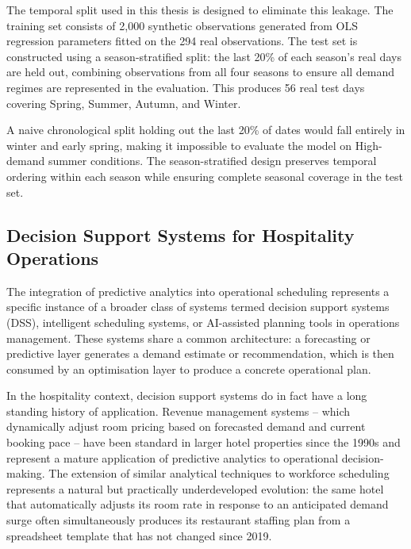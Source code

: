 \documentclass[12pt,a4paper,oneside]{article}
\begin{document}
The temporal split used in this thesis is designed to eliminate this leakage. The training set consists of 2,000 synthetic observations generated from OLS regression parameters fitted on the 294 real observations. The test set is constructed using a season-stratified split: the last 20\% of each season's real days are held out, combining observations from all four seasons to ensure all demand regimes are represented in the evaluation. This produces 56 real test days covering Spring, Summer, Autumn, and Winter.

A naive chronological split holding out the last 20\% of dates would fall entirely in winter and early spring, making it impossible to evaluate the model on High-demand summer conditions. The season-stratified design preserves temporal ordering within each season while ensuring complete seasonal coverage in the test set.

\subsection{Decision Support Systems for Hospitality Operations}

The integration of predictive analytics into operational scheduling represents a specific instance of a broader class of systems termed decision support systems (DSS), intelligent scheduling systems, or AI-assisted planning tools in operations management. These systems share a common architecture: a forecasting or predictive layer generates a demand estimate or recommendation, which is then consumed by an optimisation layer to produce a concrete operational plan.

In the hospitality context, decision support systems do in fact have a long standing history of application. Revenue management systems -- which dynamically adjust room pricing based on forecasted demand and current booking pace -- have been standard in larger hotel properties since the 1990s \citep{kimes1989} and represent a mature application of predictive analytics to operational decision-making. The extension of similar analytical techniques to workforce scheduling represents a natural but practically underdeveloped evolution: the same hotel that automatically adjusts its room rate in response to an anticipated demand surge often simultaneously produces its restaurant staffing plan from a spreadsheet template that has not changed since 2019.
\end{document}
